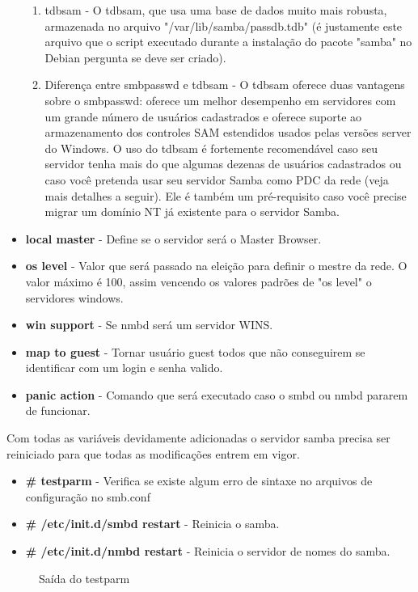 \begin{itemize}
\begin{enumerate}
			\item{tdbsam} - O tdbsam, que usa uma base de dados muito mais robusta, armazenada no arquivo "/var/lib/samba/passdb.tdb" (é justamente este arquivo que o script executado durante a instalação do pacote "samba" no Debian pergunta se deve ser criado).\cite{BACKEND}
			\item{Diferença entre smbpasswd e tdbsam} - O tdbsam oferece duas vantagens sobre o smbpasswd: oferece um melhor desempenho em servidores com um grande número de usuários cadastrados e oferece suporte ao armazenamento dos controles SAM estendidos usados pelas versões server do Windows. O uso do tdbsam é fortemente recomendável caso seu servidor tenha mais do que algumas dezenas de usuários cadastrados ou caso você pretenda usar seu servidor Samba como PDC da rede (veja mais detalhes a seguir). Ele é também um pré-requisito caso você precise migrar um domínio NT já existente para o servidor Samba. \cite{BACKEND}
		\end{enumerate}
	\item \textbf{local master} - Define se o servidor será o Master Browser.
	\item \textbf{os level} - Valor que será passado na eleição para definir o mestre da rede. O valor máximo é 100, assim vencendo os valores padrões de "os level" o servidores windows.
	\item \textbf{win support} - Se nmbd será um servidor WINS.
	\item \textbf{map to guest} - Tornar usuário guest todos que não conseguirem se identificar com um login e senha valido.
	\item \textbf{panic action} - Comando que será executado caso o smbd ou nmbd pararem de funcionar.
\end{itemize}

Com todas as variáveis devidamente adicionadas o servidor samba precisa ser reiniciado para que todas as modificações entrem em vigor.

\begin{itemize}
	\item \textbf{\# testparm} - Verifica se existe algum erro de sintaxe no arquivos de configuração no smb.conf
	\item \textbf{\# /etc/init.d/smbd restart} - Reinicia o samba.
	\item \textbf{\# /etc/init.d/nmbd restart} - Reinicia o servidor de nomes do samba.
\end{itemize}

\begin{figure}[ht]
   	\centering
   	\caption{Saída do testparm}
    \label{testparm}
\end{figure}

